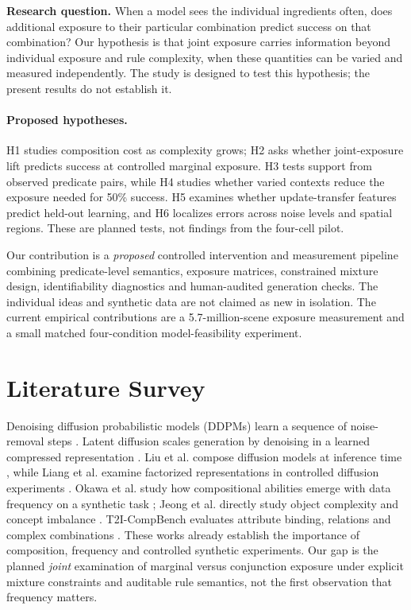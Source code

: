 \documentclass{article}
\begin{document}
\textbf{Research question.} When a model sees the individual ingredients often, does additional exposure to their particular combination predict success on that combination? Our hypothesis is that joint exposure carries information beyond individual exposure and rule complexity, when these quantities can be varied and measured independently. The study is designed to test this hypothesis; the present results do not establish it.


\paragraph{Proposed hypotheses.} H1 studies composition cost as complexity grows; H2 asks whether joint-exposure lift predicts success at controlled marginal exposure. H3 tests support from observed predicate pairs, while H4 studies whether varied contexts reduce the exposure needed for 50\% success. H5 examines whether update-transfer features predict held-out learning, and H6 localizes errors across noise levels and spatial regions. These are planned tests, not findings from the four-cell pilot.

Our contribution is a \emph{proposed} controlled intervention and measurement pipeline combining predicate-level semantics, exposure matrices, constrained mixture design, identifiability diagnostics and human-audited generation checks. The individual ideas and synthetic data are not claimed as new in isolation. The current empirical contributions are a 5.7-million-scene exposure measurement and a small matched four-condition model-feasibility experiment.
\section{Literature Survey}
Denoising diffusion probabilistic models (DDPMs) learn a sequence of noise-removal steps \cite{ho2020}. Latent diffusion scales generation by denoising in a learned compressed representation \cite{rombach2022}. Liu et al. compose diffusion models at inference time \cite{liu2022}, while Liang et al. examine factorized representations in controlled diffusion experiments \cite{liang2024}. Okawa et al. study how compositional abilities emerge with data frequency on a synthetic task \cite{okawa2023}; Jeong et al. directly study object complexity and concept imbalance \cite{jeong2026}. T2I-CompBench evaluates attribute binding, relations and complex combinations \cite{huang2023}. These works already establish the importance of composition, frequency and controlled synthetic experiments. Our gap is the planned \emph{joint} examination of marginal versus conjunction exposure under explicit mixture constraints and auditable rule semantics, not the first observation that frequency matters.
\end{document}
